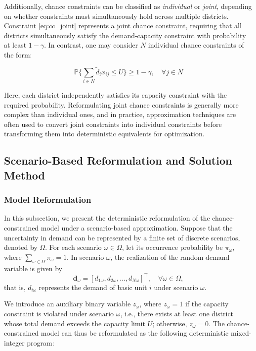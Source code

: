 \documentclass[preprint,12pt,authoryear]{elsarticle}
\begin{document}
Additionally, chance constraints can be classified as \emph{individual} or \emph{joint}, depending on whether constraints must simultaneously hold across multiple districts. Constraint \eqref{eq:cc_joint} represents a joint chance constraint, requiring that all districts simultaneously satisfy the demand-capacity constraint with probability at least $1-\gamma$. In contrast, one may consider $N$ individual chance constraints of the form:

\begin{equation}
\mathbb{P}\Big\{\sum_{i\in N} \widetilde{d}_i x_{ij} \leqslant U \Big\} \geqslant 1-\gamma, \quad \forall j \in N \label{eq:cc_individual}
\end{equation}

Here, each district independently satisfies its capacity constraint with the required probability. Reformulating joint chance constraints is generally more complex than individual ones, and in practice, approximation techniques are often used to convert joint constraints into individual constraints before transforming them into deterministic equivalents for optimization.

\subsection{Scenario-Based Reformulation and Solution Method}
\subsubsection{Model Reformulation}

In this subsection, we present the deterministic reformulation of the chance-constrained model under a scenario-based approximation. Suppose that the uncertainty in demand can be represented by a finite set of discrete scenarios, denoted by $\Omega$. For each scenario $\omega \in \Omega$, let its occurrence probability be $\pi_\omega$, where $\sum_{\omega\in\Omega} \pi_\omega = 1$. In scenario $\omega$, the realization of the random demand variable is given by
\begin{equation*}
\boldsymbol{d}_\omega = [d_{1\omega}, d_{2\omega}, \ldots, d_{N\omega}]^\top, \quad \forall \omega \in \Omega,
\end{equation*}
that is, $d_{i\omega}$ represents the demand of basic unit $i$ under scenario $\omega$. 

We introduce an auxiliary binary variable $z_\omega$, where $z_\omega = 1$ if the capacity constraint is violated under scenario $\omega$, i.e., there exists at least one district whose total demand exceeds the capacity limit $U$; otherwise, $z_\omega = 0$. The chance-constrained model can thus be reformulated as the following deterministic mixed-integer program:
\end{document}
